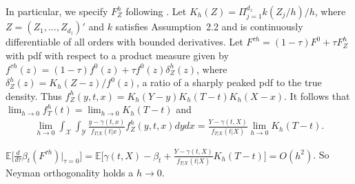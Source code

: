 \documentclass[lettersize, 12pt]{article}
\begin{document}
{In particular, we specify $F_Z^h$ following \cite{IchimuraNewey22QE}. 
Let $K_h(Z) = \Pi_{j=1}^{d_z} k(Z_j/h)/h$, where $Z = (Z_1, ..., Z_{d_z})'$ and $k$ satisfies Assumption~2.2
and is continuously differentiable of all orders with bounded derivatives.
Let $F^{\tau h} = (1-\tau)F^0 + \tau F_Z^h$
with pdf 
with respect to a product measure 
given by $f^{\tau h}(z) = (1-\tau) f^0(z) + \tau f^0(z) \delta_Z^h(z)$,
where $\delta_Z^h(z) = K_h(Z-z)/f^0(z)$, a ratio of a sharply peaked pdf to the true density.
Thus $f_{Z}^h(y,t,x) = K_h(Y-y)K_h(T-t)K_h(X-x)$.
It follows that 
$\lim_{h \rightarrow 0} f_{T}^h(t) = \lim_{h \rightarrow 0}  K_h(T-t)$ and
\begin{align*}
\lim_{h \rightarrow 0} \int_{\mathcal{X}}\int_{\mathcal{Y}} 
 \frac{y - \gamma(t,x)}{f_{T|X}(t|x)} f_{Z}^h(y,t,x) dy dx 
 =\frac{Y - \gamma(t,X)}{f_{T|X}(t|X)} \lim_{h \rightarrow 0}  K_h(T-t).
\end{align*}

$\mathbb{E}\big[
\frac{d}{d \tau}\beta_t(F^{\tau h})\big|_{\tau = 0} \big]
= 
\mathbb{E}\big[ \gamma(t,X) - \beta_t 
+ 
\frac{Y - \gamma(t,X)}{f_{T|X}(t|X)} K_h(T-t)
\big] = O(h^2)$.
So Neyman orthogonality holds a $h \rightarrow 0$.


%
%






}
\end{document}
